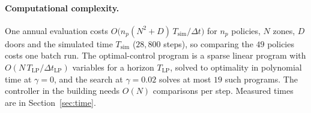 \documentclass[10pt,a4paper,twocolumn]{article}
\theoremstyle{definition}
\begin{document}
\paragraph{Computational complexity.}\label{sec:complexity} One annual evaluation costs $O\bigl(n_p(N^2+D)\,T_{\text{sim}}/\Delta t\bigr)$ for $n_p$ policies, $N$ zones, $D$ doors and the simulated time $T_{\text{sim}}$ ($28{,}800$ steps), so comparing the $49$ policies costs one batch run. The optimal-control program is a sparse linear program with $O(N\,T_{\text{LP}}/\Delta t_{\text{LP}})$ variables for a horizon $T_{\text{LP}}$, solved to optimality in polynomial time at $\gamma=0$, and the search at $\gamma=0.02$ solves at most $19$ such programs. The controller in the building needs $O(N)$ comparisons per step. Measured times are in Section~\ref{sec:time}.
\end{document}
